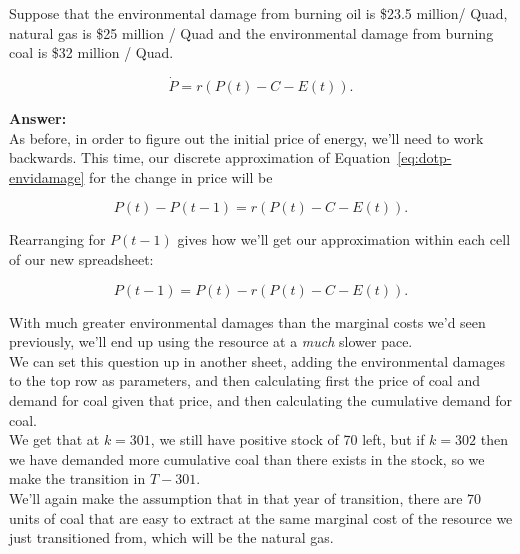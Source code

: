 \begin{enumerate}
\begin{Exercise}{Suppose that the environmental damage from burning oil is \$23.5 million/ Quad, natural gas is \$25 million / Quad and the environmental damage from burning coal is \$32 million / Quad.}
\begin{sol}
            \begin{equation}
        \dot{P} = r\left(P(t)-C-E(t)\right).
        \label{eq:dotp-envidamage}
            \end{equation}
            
      
            
            
    \end{sol}    

     \begin{sol}
         \textbf{Answer:}\\
        
        As before, in order to figure out the initial price of energy, we'll need to work backwards. This time, our discrete approximation of Equation~\eqref{eq:dotp-envidamage} for the change in price will be
        
             \begin{equation*}
        P(t) - P(t-1) = r\left(P(t)-C-E(t)\right).
            \end{equation*}
            
        Rearranging for $P(t-1)$ gives how we'll get our approximation within each cell of our new spreadsheet:
        
        \begin{equation}
             P(t-1) = P(t)- r\left(P(t)-C-E(t)\right).
             \label{eq:approx-envidamages}
        \end{equation}  
        
        With much greater environmental damages than the marginal costs we'd seen previously, we'll end up using the resource at a \textit{much} slower pace.\\
        
        We can set this question up in another sheet, adding the environmental damages to the top row as parameters, and then calculating first the price of coal and demand for coal given that price, and then calculating the cumulative demand for coal.\\
        
        We get that at $k=301$, we still have positive stock of 70 left, but if $k=302$ then we have demanded more cumulative coal than there exists in the stock, so we make the transition in $T-301$.\\
        
        We'll again make the assumption that in that year of transition, there are 70 units of coal that are easy to extract at the same marginal cost of the resource we just transitioned from, which will be the natural gas.\\
        

\end{sol}
\end{Exercise}
\end{enumerate}
